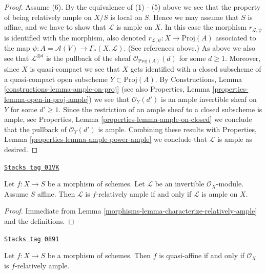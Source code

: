 \begin{proof}
\medskip\noindent
Assume (6). By the equivalence of (1) - (5) above we see that the
property of being relatively ample on $X/S$ is local on $S$. Hence
we may assume that $S$ is affine, and we have to show that
$\mathcal{L}$ is ample on $X$. In this case the morphism
$r_{\mathcal{L}, \psi}$ is identified with the morphism, also denoted
$r_{\mathcal{L}, \psi} : X \to \text{Proj}(A)$ associated to the map
$\psi : A = \mathcal{A}(V) \to \Gamma_*(X, \mathcal{L})$.
(See references above.) As above we also see that
$\mathcal{L}^{\otimes d}$ is the pullback of the sheaf
$\mathcal{O}_{\text{Proj}(A)}(d)$ for some $d \geq 1$.
Moreover, since $X$ is quasi-compact we
see that $X$ gets identified with a closed subscheme of a
quasi-compact open subscheme $Y \subset \text{Proj}(A)$.
By
Constructions, Lemma
\ref{constructions-lemma-ample-on-proj}
(see also
Properties, Lemma
\ref{properties-lemma-open-in-proj-ample})
we see that $\mathcal{O}_Y(d')$ is an ample invertible sheaf on
$Y$ for some $d' \geq 1$. Since the restriction of an ample
sheaf to a closed subscheme is ample, see
Properties, Lemma
\ref{properties-lemma-ample-on-closed}
we conclude that the pullback of
$\mathcal{O}_Y(d')$ is ample. Combining these results with
Properties, Lemma
\ref{properties-lemma-ample-power-ample}
we conclude that $\mathcal{L}$ is ample as desired.
\end{proof}

\begin{lemma}
\label{morphisms-lemma-ample-over-affine}
\href{https://stacks.math.columbia.edu/tag/01VK}{\texttt{Stacks tag 01VK}}

\begin{reference}
\cite[II Corollary 4.6.6]{EGA}
\end{reference}
Let $f : X \to S$ be a morphism of schemes.
Let $\mathcal{L}$ be an invertible $\mathcal{O}_X$-module.
Assume $S$ affine.
Then $\mathcal{L}$ is $f$-relatively ample if and only
if $\mathcal{L}$ is ample on $X$.
\end{lemma}

\begin{proof}

Immediate from Lemma \ref{morphisms-lemma-characterize-relatively-ample}
and the definitions.
\end{proof}

\begin{lemma}
\label{morphisms-lemma-quasi-affine-O-ample}
\href{https://stacks.math.columbia.edu/tag/0891}{\texttt{Stacks tag 0891}}

\begin{reference}
\cite[II Proposition 5.1.6]{EGA}
\end{reference}
Let $f : X \to S$ be a morphism of schemes. Then $f$ is quasi-affine
if and only if $\mathcal{O}_X$ is $f$-relatively ample.
\end{lemma}


